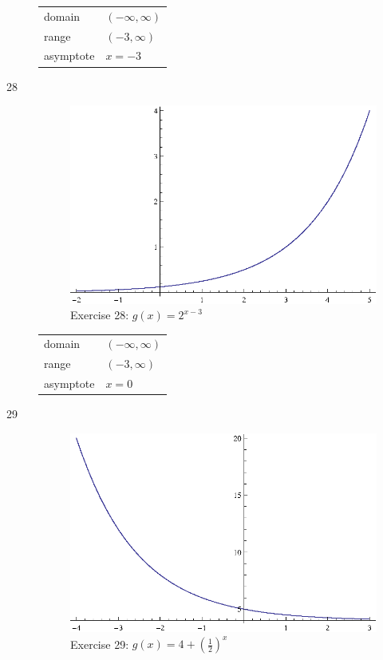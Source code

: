 \documentclass{exam}
\begin{document}
\begin{description}
        \begin{tabular}[H]{ll}
          \toprule
          domain    & $(-\infty, \infty)$ \\
          range     & $(-3, \infty)$ \\
          asymptote & $x = -3$ \\
          \bottomrule
        \end{tabular}

      \item[28] 
        \begin{figure}[H]
          \centering
          \includegraphics[scale=1.0]{exercise28.eps}
          \caption*{Exercise 28: $g(x) = 2^{x - 3}$}
        \end{figure}

        \begin{tabular}[H]{ll}
          \toprule
          domain    & $(-\infty, \infty)$ \\
          range     & $(-3, \infty)$ \\
          asymptote & $x = 0$ \\
          \bottomrule
        \end{tabular}

      \item[29] 
        \begin{figure}[H]
          \centering
          \includegraphics[scale=1.0]{exercise29.eps}
          \caption*{Exercise 29: $g(x) = 4 + \left( \frac{1}{2} \right)^x$}
        \end{figure}


\end{description}
\end{document}
